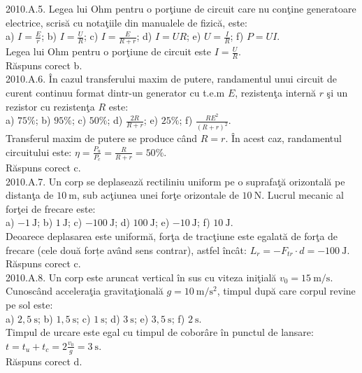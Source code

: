 2010.A.5. Legea lui Ohm pentru o porţiune de circuit care nu conţine generatoare electrice, scrisă cu notaţiile din manualele de fizică, este:\\ a) $I=\frac{E}{r}$; b) $I=\frac{U}{R}$; c) $I=\frac{E}{R+r}$; d) $I=U R$; e) $U=\frac{I}{R}$; f) $P=U I$.\\ Legea lui Ohm pentru o porţiune de circuit este $I=\frac{U}{R}$.\\ Răspuns corect b.\\

2010.A.6. În cazul transferului maxim de putere, randamentul unui circuit de curent continuu format dintr-un generator cu t.e.m $E$, rezistenţa internă $r$ şi un rezistor cu rezistenţa $R$ este:\\ a) $75 \%$; b) $95 \%$; c) $50 \%$; d) $\frac{2 R}{R+r}$; e) $25 \%$; f) $\frac{R E^{2}}{(R+r)^{2}}$.\\ Transferul maxim de putere se produce când $R=r$. În acest caz, randamentul circuitului este: $\eta=\frac{P_{u}}{P_{c}}=\frac{R}{R+r}=50 \%$.\\ Răspuns corect c.\\

2010.A.7. Un corp se deplasează rectiliniu uniform pe o suprafaţă orizontală pe distanţa de $10 \mathrm{~m}$, sub acţiunea unei forţe orizontale de $10 \mathrm{~N}$. Lucrul mecanic al forţei de frecare este:\\ a) $-1 \mathrm{~J}$; b) $1 \mathrm{~J}$; c) $-100 \mathrm{~J}$; d) $100 \mathrm{~J}$; e) $-10 \mathrm{~J}$; f) $10 \mathrm{~J}$.\\ Deoarece deplasarea este uniformă, forţa de tracţiune este egalată de forţa de frecare (cele două forțe având sens contrar), astfel încât: $L_{r}=-F_{t r} \cdot d=-100 \mathrm{~J}$.\\ Răspuns corect c.\\

2010.A.8. Un corp este aruncat vertical în sus cu viteza iniţială $v_{0}=15 \mathrm{~m} / \mathrm{s}$. Cunoscând acceleraţia gravitaţională $g=10 \mathrm{~m} / \mathrm{s}^{2}$, timpul după care corpul revine pe sol este:\\ a) $2,5 \mathrm{~s}$; b) $1,5 \mathrm{~s}$; c) $1 \mathrm{~s}$; d) $3 \mathrm{~s}$; e) $3,5 \mathrm{~s}$; f) $2 \mathrm{~s}$.\\ Timpul de urcare este egal cu timpul de coborâre în punctul de lansare: $t=t_{u}+t_{c}=2 \frac{v_{0}}{g}=3 \mathrm{~s}$.\\ Răspuns corect d.\\

